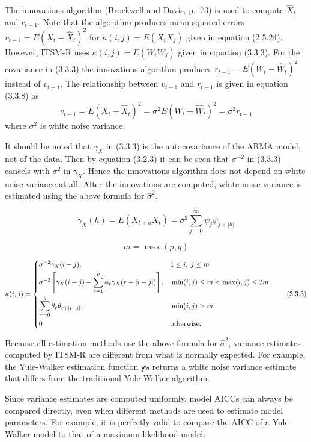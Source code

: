 \documentclass[12pt]{article}
\begin{document}
The innovations algorithm (Brockwell and Davis, p.~73)
is used to compute $\hat X_t$ and $r_{t-1}$.
Note that the algorithm produces mean squared errors
$v_{t-1}=E(X_t-\hat X_t)^2$ for $\kappa(i,j)=E(X_iX_j)$
given in equation (2.5.24).
However, ITSM-R uses $\kappa(i,j)=E(W_iW_j)$ given in
equation (3.3.3).
For the covariance in (3.3.3)
the innovations algorithm produces $r_{t-1}=E(W_t-\hat W_t)^2$
instead of $v_{t-1}$.
The relationship between $v_{t-1}$ and $r_{t-1}$ is given in
equation (3.3.8) as
\[
v_{t-1}=E(X_t-\hat X_t)^2=\sigma^2E(W_t-\hat W_t)^2=\sigma^2r_{t-1}
\]
where $\sigma^2$ is white noise variance.

It should be noted that $\gamma_X$ in (3.3.3) is
the autocovariance of the ARMA model, not of the data.
Then by equation (3.2.3) it can be seen that $\sigma^{-2}$ in (3.3.3)
cancels with $\sigma^2$ in $\gamma_X$.
Hence the innovations algorithm does not depend on white noise variance at all.
After the innovations are computed, white noise variance is estimated
using the above formula for $\hat\sigma^2$.

\[
\gamma_X(h)=E(X_{t+h}X_t)=\sigma^2\sum_{j=0}^\infty\psi_j\psi_{j+|h|}\tag{3.2.3}
\]

\[
m=\max(p,q)\tag{3.3.2}
\]

\[
\kappa(i,j)=\left\{
\begin{aligned}
&\sigma^{-2}\gamma_X(i-j), && 1\le i,\;j\le m\\
&\sigma^{-2}\left[
\gamma_X(i-j)-\sum_{r=1}^p\phi_r\gamma_X(r-|i-j|)\right],
&& \min(i,j)\le m<\max(i,j)\le2m,\\
&\sum_{r=0}^q\theta_r\theta_{r+|i-j|},&&\min(i,j)>m,\\
&0&&\hbox{otherwise.}
\end{aligned}
\right.\tag{3.3.3}
\]

Because all estimation methods use the above formula for $\hat\sigma^2$,
variance estimates computed by ITSM-R are different from what is normally
expected.
For example, the Yule-Walker estimation function {\tt yw} returns a white noise
variance estimate that differs from the traditional Yule-Walker algorithm.

Since variance estimates are computed uniformly,
model AICCs can always be compared directly,
even when different methods are used to estimate model parameters.
For example, it is perfectly valid to compare the AICC of a Yule-Walker
model to that of a maximum likelihood model.
\end{document}
